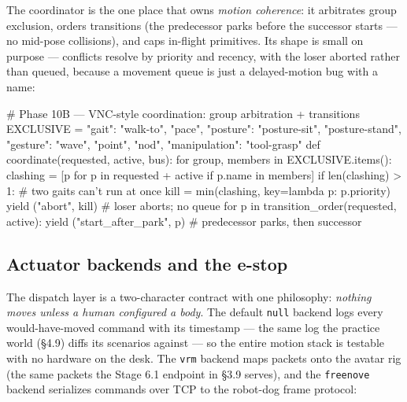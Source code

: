 \documentclass[11pt]{article}
\begin{document}
The coordinator is the one place that owns \emph{motion coherence}: it arbitrates group exclusion, orders transitions (the predecessor parks before the successor starts — no mid-pose collisions), and caps in-flight primitives. Its shape is small on purpose — conflicts resolve by priority and recency, with the loser aborted rather than queued, because a movement queue is just a delayed-motion bug with a name:

\begin{CodeBlock}
# Phase 10B — VNC-style coordination: group arbitration + transitions
EXCLUSIVE = {"gait": {"walk-to", "pace"}, "posture": {"posture-sit", "posture-stand"},
             "gesture": {"wave", "point", "nod"}, "manipulation": {"tool-grasp"}}
def coordinate(requested, active, bus):
    for group, members in EXCLUSIVE.items():
        clashing = [p for p in requested + active if p.name in members]
        if len(clashing) > 1:                       # two gaits can't run at once
            kill = min(clashing, key=lambda p: p.priority)
            yield ("abort", kill)                    # loser aborts; no queue
    for p in transition_order(requested, active):
        yield ("start_after_park", p)                # predecessor parks, then successor
\end{CodeBlock}

\subsection{Actuator backends and the e-stop}

The dispatch layer is a two-character contract with one philosophy: \emph{nothing moves unless a human configured a body}. The default \texttt{null} backend logs every would-have-moved command with its timestamp — the same log the practice world (§4.9) diffs its scenarios against — so the entire motion stack is testable with no hardware on the desk. The \texttt{vrm} backend maps packets onto the avatar rig (the same packets the Stage 6.1 endpoint in §3.9 serves), and the \texttt{freenove} backend serializes commands over TCP to the robot-dog frame protocol:

\end{document}

